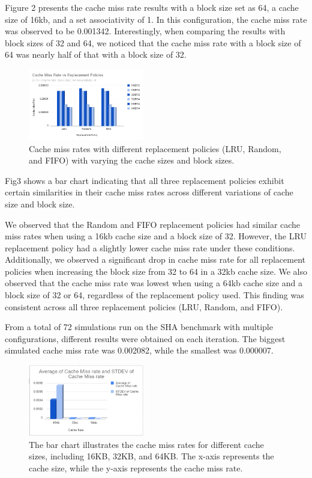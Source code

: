 \documentclass[conference]{IEEEtran}
\begin{document}
Figure 2 presents the cache miss rate results with a block size set as 64, a cache size of 16kb, and a set associativity of 1. In this configuration, the cache miss rate was observed to be 0.001342. Interestingly, when comparing the results with block sizes of 32 and 64, we noticed that the cache miss rate with a block size of 64 was nearly half of that with a block size of 32.


\begin{figure}[H]
    \centering
    \includegraphics[width=0.45\textwidth]{sha/sha_cache_vs_repl8.png}
    \caption{Cache miss rates with different replacement policies (LRU, Random, and FIFO) with varying the cache sizes and block sizes.}
\end{figure}

Fig3 shows a bar chart indicating that all three replacement policies exhibit certain similarities in their cache miss rates across different variations of cache size and block size.


We observed that the Random and FIFO replacement policies had similar cache miss rates when using a 16kb cache size and a block size of 32. However, the LRU replacement policy had a slightly lower cache miss rate under these conditions. Additionally, we observed a significant drop in cache miss rate for all replacement policies when increasing the block size from 32 to 64 in a 32kb cache size. We also observed that the cache miss rate was lowest when using a 64kb cache size and a block size of 32 or 64, regardless of the replacement policy used. This finding was consistent across all three replacement policies (LRU, Random, and FIFO).


From a total of 72 simulations run on the SHA benchmark with multiple configurations, different results were obtained on each iteration. The biggest simulated cache miss rate was 0.002082, while the smallest was 0.000007.

\begin{figure}[H]
    \centering
    \includegraphics[width=0.45\textwidth]{sha/sha_avg_cachesize.png}
    \caption{The bar chart illustrates the cache miss rates for different cache sizes, including 16KB, 32KB, and 64KB. The x-axis represents the cache size, while the y-axis represents the cache miss rate.}
\end{figure}
\end{document}
